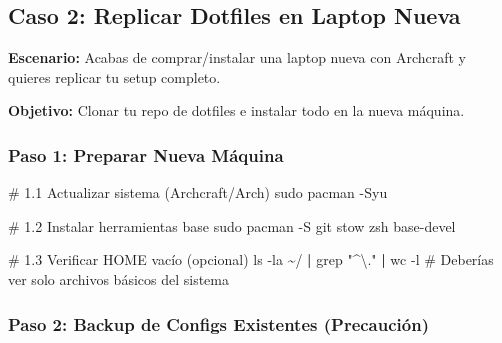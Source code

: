 \documentclass[
  doc,
  floatsintext,
  longtable,
  a4paper,
  nolmodern,
  notxfonts,
  notimes,
  12pt,
  colorlinks=true,linkcolor=blue,citecolor=blue,urlcolor=blue]{apa7}
\newenvironment{Shaded}{\begin{snugshade}}{\end{snugshade}}
\newcommand{\AttributeTok}[1]{\textcolor[rgb]{0.40,0.45,0.13}{#1}}
\newcommand{\CommentTok}[1]{\textcolor[rgb]{0.37,0.37,0.37}{#1}}
\newcommand{\FunctionTok}[1]{\textcolor[rgb]{0.28,0.35,0.67}{#1}}
\newcommand{\KeywordTok}[1]{\textcolor[rgb]{0.00,0.23,0.31}{\textbf{#1}}}
\newcommand{\NormalTok}[1]{\textcolor[rgb]{0.00,0.23,0.31}{#1}}
\newcommand{\StringTok}[1]{\textcolor[rgb]{0.13,0.47,0.30}{#1}}
\begin{document}
\subsection{Caso 2: Replicar Dotfiles en Laptop
Nueva}\label{caso-2-replicar-dotfiles-en-laptop-nueva}

\textbf{Escenario:} Acabas de comprar/instalar una laptop nueva con
Archcraft y quieres replicar tu setup completo.

\textbf{Objetivo:} Clonar tu repo de dotfiles e instalar todo en la
nueva máquina.

\subsubsection{Paso 1: Preparar Nueva
Máquina}\label{paso-1-preparar-nueva-muxe1quina}

\begin{Shaded}
\begin{Highlighting}[]
\CommentTok{\# 1.1 Actualizar sistema (Archcraft/Arch)}
\FunctionTok{sudo}\NormalTok{ pacman }\AttributeTok{{-}Syu}

\CommentTok{\# 1.2 Instalar herramientas base}
\FunctionTok{sudo}\NormalTok{ pacman }\AttributeTok{{-}S}\NormalTok{ git stow zsh base{-}devel}

\CommentTok{\# 1.3 Verificar HOME vacío (opcional)}
\FunctionTok{ls} \AttributeTok{{-}la}\NormalTok{ \textasciitilde{}/ }\KeywordTok{|} \FunctionTok{grep} \StringTok{"\^{}\textbackslash{}."} \KeywordTok{|} \FunctionTok{wc} \AttributeTok{{-}l}
\CommentTok{\# Deberías ver solo archivos básicos del sistema}
\end{Highlighting}
\end{Shaded}

\subsubsection{Paso 2: Backup de Configs Existentes
(Precaución)}\label{paso-2-backup-de-configs-existentes-precauciuxf3n}
\end{document}
